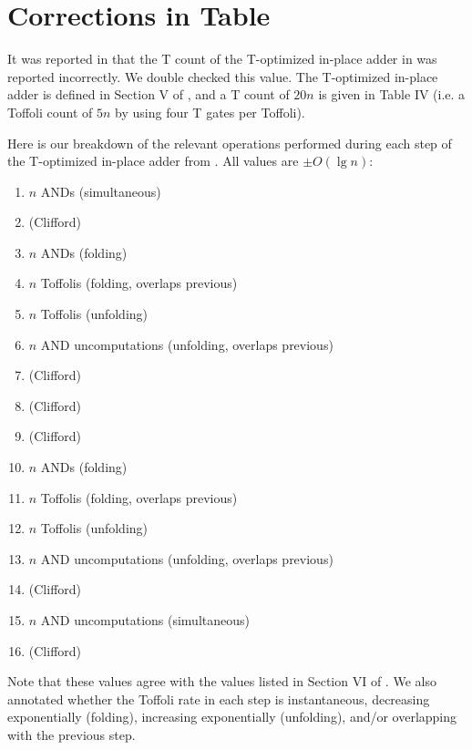 \documentclass[onecolumn,unpublished]{quantumarticle}
\theoremstyle{definition}
\theoremstyle{definition}
\theoremstyle{definition}
\begin{document}



\appendix

\section{Corrections in Table}
\label{app:correction}

It was reported in \cite{oonishi2020efficient} that the T count of the T-optimized in-place adder in \cite{thapliyal2020lookahead} was reported incorrectly.
We double checked this value.
The T-optimized in-place adder is defined in Section V of \cite{thapliyal2020lookahead}, and a T count of $20n$ is given in Table IV (i.e. a Toffoli count of $5n$ by using four T gates per Toffoli).

Here is our breakdown of the relevant operations performed during each step of the T-optimized in-place adder from \cite{thapliyal2020lookahead}.
All values are $\pm O(\lg n)$:

\begin{enumerate}
    \item $n$ ANDs (simultaneous)
    \item (Clifford)
    \item $n$ ANDs (folding)
    \item $n$ Toffolis (folding, overlaps previous)
    \item $n$ Toffolis (unfolding)
    \item $n$ AND uncomputations (unfolding, overlaps previous)
    \item (Clifford)
    \item (Clifford)
    \item (Clifford)
    \item $n$ ANDs (folding)
    \item $n$ Toffolis (folding, overlaps previous)
    \item $n$ Toffolis (unfolding)
    \item $n$ AND uncomputations (unfolding, overlaps previous)
    \item (Clifford)
    \item $n$ AND uncomputations (simultaneous)
    \item (Clifford)
\end{enumerate}

Note that these values agree with the values listed in Section VI of \cite{thapliyal2020lookahead}.
We also annotated whether the Toffoli rate in each step is instantaneous, decreasing exponentially (folding), increasing exponentially (unfolding), and/or overlapping with the previous step.
\end{document}
